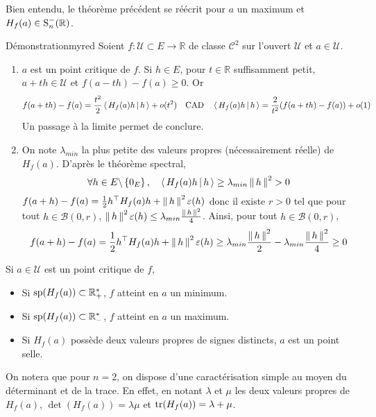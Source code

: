     Bien entendu, le théorème précédent se réécrit pour $a$ un maximum et $H_f(a) \in \S_n^{-}(\mathbb{R})$.

    \begin{demo}{Démonstration}{myred}
        Soient $f : \mathcal{U} \subset E \to \mathbb{R}$ de classe $\mathcal{C}^2$ sur l’ouvert $\mathcal{U}$ et $a \in \mathcal{U}$. 
        \begin{enumerate}
            \item $a$ est un point critique de $f$. Si $h \in E$, pour $t \in \mathbb{R}$ suffisamment petit, $a + th \in \mathcal{U}$ et $f(a - th) - f(a) \geq 0$. Or 
            \[ f(a + th) - f(a) = \frac{t^2}{2}\spr{H_f(a)h}{h} + o(t^2) \esp{CAD} \spr{H_f(a)h}{h} = \frac{2}{t^2} (f(a + th) - f(a)) + o(1) \]     
            Un passage à la limite permet de conclure. 
            \item On note $\lambda_{min}$ la plus petite des valeurs propres (nécessairement réelle) de $H_f(a)$. D’après le théorème spectral, 
            \[ \forall h \in E \backslash \left\{0_E\right\}, \quad \spr{H_f(a)h}{h} \geq \lambda_{min}\norm{h}^2 > 0 \]   
            $f(a + h) - f(a) = \frac{1}{2} h^{\top} H_f(a) h + \norm{h}^2 \varepsilon(h)$ donc il existe $r > 0$ tel que pour tout $h \in \mathcal{B}(0,r)$, $\norm{h}^2 \varepsilon(h) \leq \lambda_{min} \frac{\norm{h}^2}{4}$. Ainsi, pour tout $h \in \mathcal{B}(0,r)$, 
            \[ f(a+h) - f(a) = \frac{1}{2}h^{\top} H_f(a) h + \norm{h}^2 \varepsilon(h) \geq \lambda_{min}\frac{\norm{h}^2}{2} - \lambda_{min} \frac{\norm{h}^2}{4} \geq 0 \]
        \end{enumerate}
    \end{demo}

    \begin{coro}{}{}
        Si $a \in \mathcal{U}$ est un point critique de $f$, 
        \begin{itemize}
            \item Si $\sp(H_f(a)) \subset \mathbb{R}^*_+$, $f$ atteint en $a$ un minimum.
            \item Si $\sp(H_f(a)) \subset \mathbb{R}^*_-$, $f$ atteint en $a$ un maximum.
            \item Si $H_f(a)$ possède deux valeurs propres de signes distincts, $a$ est un point selle.
        \end{itemize}
    \end{coro}

    On notera que pour $n = 2$, on dispose d’une caractérisation simple au moyen du déterminant et de la trace. En effet, en notant $\lambda$ et $\mu$ les deux valeurs propres de $H_f(a)$, $\det(H_f(a)) = \lambda \mu$ et $\tr(H_f(a)) = \lambda + \mu$.

